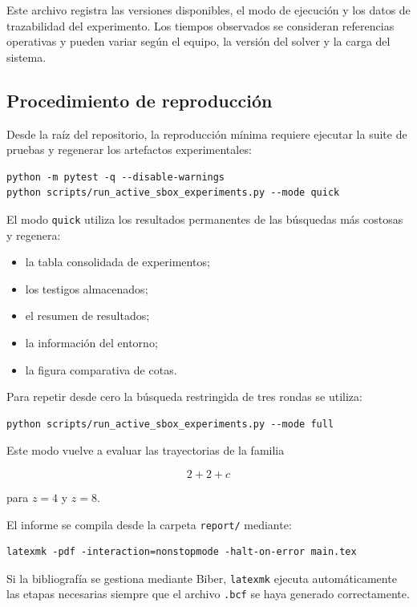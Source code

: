 Este archivo registra las versiones disponibles, el modo de ejecución y
los datos de trazabilidad del experimento. Los tiempos observados se
consideran referencias operativas y pueden variar según el equipo, la
versión del solver y la carga del sistema.


\subsection{Procedimiento de reproducción}
\label{subsec:procedimiento_reproduccion}

Desde la raíz del repositorio, la reproducción mínima requiere ejecutar
la suite de pruebas y regenerar los artefactos experimentales:

\begin{verbatim}
python -m pytest -q --disable-warnings
python scripts/run_active_sbox_experiments.py --mode quick
\end{verbatim}

El modo \texttt{quick} utiliza los resultados permanentes de las búsquedas
más costosas y regenera:

\begin{itemize}
    \item la tabla consolidada de experimentos;
    \item los testigos almacenados;
    \item el resumen de resultados;
    \item la información del entorno;
    \item la figura comparativa de cotas.
\end{itemize}

Para repetir desde cero la búsqueda restringida de tres rondas se utiliza:

\begin{verbatim}
python scripts/run_active_sbox_experiments.py --mode full
\end{verbatim}

Este modo vuelve a evaluar las trayectorias de la familia

\[
2+2+c
\]

para $z=4$ y $z=8$.

El informe se compila desde la carpeta \texttt{report/} mediante:

\begin{verbatim}
latexmk -pdf -interaction=nonstopmode -halt-on-error main.tex
\end{verbatim}

Si la bibliografía se gestiona mediante Biber, \texttt{latexmk} ejecuta
automáticamente las etapas necesarias siempre que el archivo
\texttt{.bcf} se haya generado correctamente.


